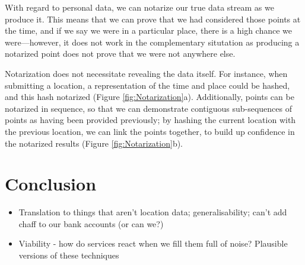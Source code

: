 \documentclass{IOS-Book-Article}     %
\begin{document}
With regard to personal data, we can notarize our true data stream as we produce
it. This means that we can prove that we had considered those points at the
time, and if we say we were in a particular place, there is a high chance we
were---however, it does not work in the complementary situtation as producing a
notarized point does not prove that we were not anywhere else.


Notarization does not necessitate revealing the data itself. For instance,
when submitting a location, a representation of the time and place could be
hashed, and this hash notarized (Figure \ref{fig:Notarization}a). Additionally,
points can be notarized in sequence, so that we can demonstrate contiguous sub-sequences 
of points as having been provided previously; by
hashing the current location with the previous location, we can link the points
together, to build up confidence in the notarized results (Figure
\ref{fig:Notarization}b).

\section{Conclusion}

\begin{itemize}
  \item Translation to things that aren't location data; generalisability; can't
  add chaff to our bank accounts (or can we?)
  \item Viability - how do services react when we fill them full of noise?
  Plausible versions of these techniques
\end{itemize}




\end{document}
